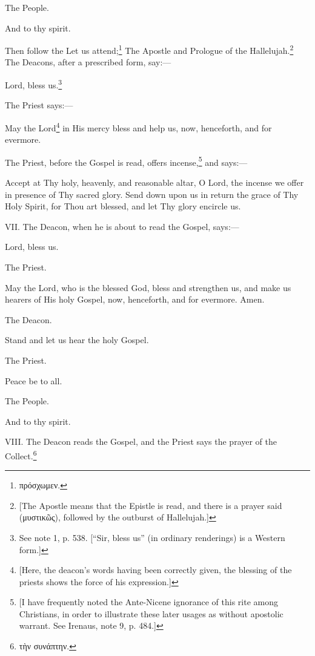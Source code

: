 The People.

And to thy spirit.

Then follow the Let us attend;\footnote{\par  \textgreek{πρόσχωμεν}.} The Apostle and Prologue of the Hallelujah.\footnote{\par{}  [The Apostle means that the Epistle is read, and there is a prayer said (\textgreek{μυστικῶς}), followed by the outburst of Hallelujah.]} The Deacons, after a prescribed form, say:—

Lord, bless us.\footnote{\par  See note 1, p. 538. [“Sir, bless us” (in ordinary renderings) is a Western form.]}

The Priest says:—

May the Lord\footnote{\par{}  [Here, the deacon’s words having been correctly given, the blessing of the priests shows the force of his expression.]} in His mercy bless and help us, now, henceforth, and for evermore.

The Priest, before the Gospel is read, offers incense,\footnote{\par{}  [I have frequently noted the Ante-Nicene ignorance of this rite among Christians, in order to illustrate these later usages as without apostolic warrant. See Irenaus, note 9, p. 484.]} and says:—

Accept at Thy holy, heavenly, and reasonable altar, O Lord, the incense we offer in presence of Thy sacred glory. Send down upon us in return the grace of Thy Holy Spirit, for Thou art blessed, and let Thy glory encircle us.

VII. The Deacon, when he is about to read the Gospel, says:—

Lord, bless us.

The Priest.

May the Lord, who is the blessed God, bless and strengthen us, and make us hearers of His holy Gospel, now, henceforth, and for evermore. Amen.

The Deacon.

Stand and let us hear the holy Gospel.

The Priest.

Peace be to all.

The People.

And to thy spirit.

VIII. The Deacon reads the Gospel, and the Priest says the prayer of the Collect.\footnote{\par  \textgreek{τὴν συνάπτην}.}

